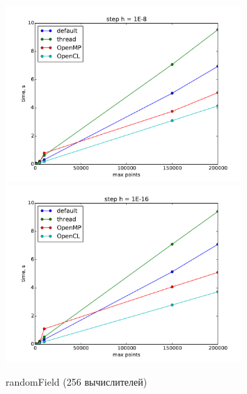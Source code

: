 \documentclass[14pt,final,titlepage,pscyr]{hedwork}
\begin{document}
\begin{figure}[ht!]
    \center
    \includegraphics[width=0.8\textwidth]{randomField_my_1E-8}
    \includegraphics[width=0.8\textwidth]{randomField_my_1E-16}
    \caption{randomField (256 вычислителей)}
\end{figure}

\pagebreak
\end{document}
